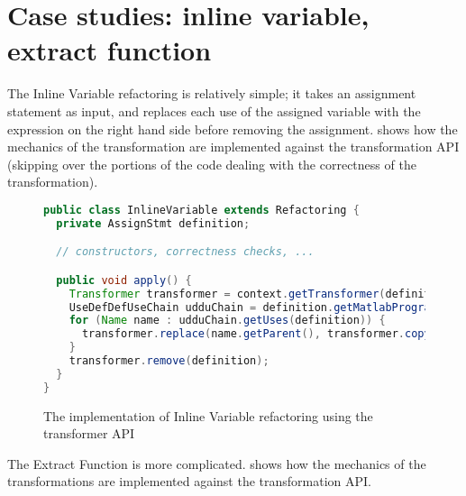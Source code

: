\section{Case studies: inline variable, extract function}

The Inline Variable refactoring is relatively simple; it takes an assignment
statement as input, and replaces each use of the assigned variable with the
expression on the right hand side before removing the assignment.
 shows how the mechanics of the transformation are
implemented against the transformation API (skipping over the portions of the
code dealing with the correctness of the transformation).

\begin{figure}
\begin{lstlisting}[numbers=none, language=Java]
public class InlineVariable extends Refactoring {
  private AssignStmt definition;

  // constructors, correctness checks, ...

  public void apply() {
    Transformer transformer = context.getTransformer(definition);
    UseDefDefUseChain udduChain = definition.getMatlabProgram().analyze().getUseDefDefUseChain();
    for (Name name : udduChain.getUses(definition)) {
      transformer.replace(name.getParent(), transformer.copy(definition.getRHS()));
    }
    transformer.remove(definition);
  }
}
\end{lstlisting}
\caption{The implementation of Inline Variable refactoring using the transformer API}
\label{Fig:InlineVariable}
\end{figure}

The Extract Function is more complicated.  shows how the
mechanics of the transformations are implemented against the transformation API.

